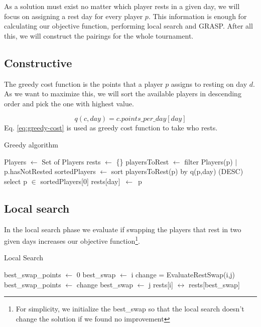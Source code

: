 \documentclass[a4paper, 10pt]{article}
\begin{document}

As a solution must exist no matter which player rests in a given day, we will focus on assigning a rest day for every player $p$. This information is enough for calculating our objective function, performing local search and GRASP. After all this, we will construct the pairings for the whole tournament.

\subsection{Constructive}

The greedy cost function is the points that a player $p$ assigns to resting on day $d$. As we want to maximize this, we will sort the available players in descending order and pick the one with highest value.

\begin{equation}
  \label{eq:greedy-cost}
  q(c,day)= c.points\_per\_day[day]
\end{equation}
Eq. \ref{eq:greedy-cost} is used as greedy cost function to take who rests.


\begin{algorithm}
	\caption{Greedy algorithm} 
	\begin{algorithmic}[1]
	  \State Players $\leftarrow$ Set of Players
	  \State rests $\leftarrow$ \{\}
	      \State playersToRest $\leftarrow$ filter Players(p) $|$ p.hasNotRested
        \State sortedPlayers $\leftarrow$ sort playersToRest(p) by q(p,day) (DESC) 
	      \State select p $\in$ sortedPlayers[0]
	      \State rests[day]\ $\leftarrow$\ p
	    \EndFor
	\end{algorithmic} 
\end{algorithm}


\subsection{Local search}

In the local search phase we evaluate if swapping the players that rest in two given days increases our objective function\footnote{For simplicity, we initialize the best\_swap so that the local search doesn't change the solution if we found no improvement}.

\begin{algorithm}
	\caption{Local Search} 
	\begin{algorithmic}[1]
    \State best\_swap\_points $\leftarrow$ 0
    \State best\_swap $\leftarrow$ i
        \State change = EvaluateRestSwap(i,j)
          \State best\_swap\_points $\leftarrow$ change
          \State best\_swap $\leftarrow$ j
        \EndIf
      \EndFor
      \State rests[i] $\leftrightarrow$ rests[best\_swap]
		\EndFor
	\end{algorithmic} 
\end{algorithm}
\end{document}
